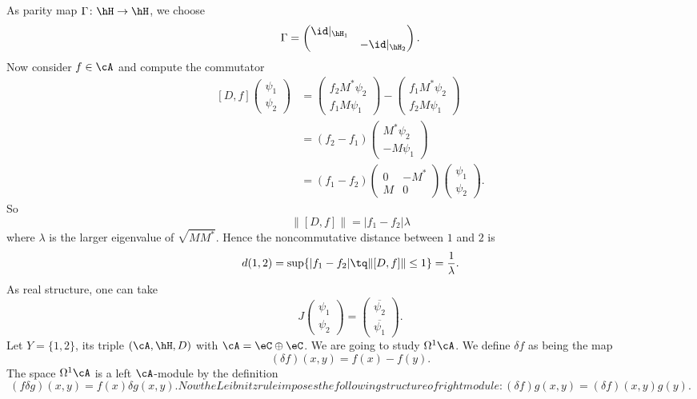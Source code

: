 As parity map $\Gamma\colon \hH\to \hH$, we choose
\[ 
  \Gamma=\begin{pmatrix}
\id|_{\hH_1}\\ &-\id|_{\hH_2}
\end{pmatrix}.
\]
Now consider $f\in\cA$ and compute the commutator
\[ 
\begin{split}
  [D,f]\begin{pmatrix}
\psi_1\\\psi_2
\end{pmatrix}
&=
\begin{pmatrix}
f_2 M^*\psi_2\\f_1M\psi_1
\end{pmatrix}
-
\begin{pmatrix}
f_1M^*\psi_2\\f_2M\psi_1
\end{pmatrix}\\
&=(f_2-f_1)\begin{pmatrix}
M^*\psi_2\\-M\psi_1
\end{pmatrix}\\
&=(f_1-f_2)\begin{pmatrix}
0&-M^*\\M&0
\end{pmatrix}
\begin{pmatrix}
\psi_1\\\psi_2
\end{pmatrix}.
\end{split}  
\]
So 
\[ 
  \| [D,f] \|=| f_1-f_2 |\lambda
\]
where $\lambda$ is the larger eigenvalue of $\sqrt{MM^*}$. Hence the noncommutative distance between $1$ and $2$ is 
\[ 
  d(1,2)=\sup\{ | f_1-f_2 |\tq \| [D,f] \|\leq 1 \}=\frac{1}{ \lambda }.
\]
As real structure, one can take
\[ 
  J\begin{pmatrix}
\psi_1\\\psi_2
\end{pmatrix}=
\begin{pmatrix}
\overline{ \psi_2 }\\\overline{ \psi_1 }
\end{pmatrix}.
\]
Let $Y=\{ 1,2 \}$, its triple $(\cA,\hH,D)$ with $\cA=\eC\oplus\eC$. We are going to study $\Omega^1\cA$. We define $\delta f$ as being the map
\begin{equation}
	(\delta f)(x,y)=f(x)-f(y).
\end{equation}
The space $\Omega^1\cA$ is a left $\cA$-module by the definition
\begin{subequations}
\begin{equation}
(f\delta g)(x,y)=f(x)\delta g(x,y).          \label{SubEqfdeltagxya}  
\end{equation}
Now the Leibnitz rule imposes the following structure of right module:
\begin{equation}
	(\delta f)g(x,y)=(\delta f)(x,y)g(y).   \label{SubEqfdeltagxyb}
\end{equation}
\end{subequations}
